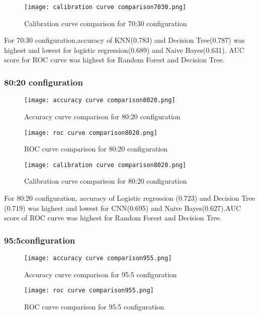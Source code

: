 \documentclass{article}
\begin{document}
\begin{figure}[H]
\centering
\texttt{[image: calibration curve comparison7030.png]}
\caption {Calibration curve comparison for 70:30 configuration}
\label{fig-name}
\end{figure}

For 70:30 configuration,accuracy of KNN(0.783) and Decision Tree(0.787) was highest and lowest for logistic regression(0.689) and Naive Bayes(0.631). AUC score for ROC curve was highest for Random Forest and Decision Tree.
\subsubsection{80:20 configuration}
\begin{figure}[H]
\centering
\texttt{[image: accuracy curve comparison8020.png]}
\caption {Accuracy curve comparison for 80:20 configuration}
\label{fig-name}
\end{figure}

\begin{figure}[H]
\centering
\texttt{[image: roc curve comparison8020.png]}
\caption {ROC curve comparison for 80:20 configuration}
\label{fig-name}
\end{figure}


\begin{figure}[H]
\centering
\texttt{[image: calibration curve comparison8020.png]}
\caption {Calibration curve comparison for 80:20 configuration}
\label{fig-name}
\end{figure}
For 80:20 configuration, accuracy of Logistic regression (0.723) and Decision Tree (0.719) was highest and lowest for CNN(0.695) and Naive Bayes(0.627).AUC score of ROC curve was highest for Random Forest and Decision Tree.

\subsubsection{95:5configuration}
\begin{figure}[H]
\centering
\texttt{[image: accuracy curve comparison955.png]}
\caption {Accuracy curve comparison for 95:5 configuration}
\label{fig-name}
\end{figure}


\begin{figure}[H]
\centering
\texttt{[image: roc curve comparison955.png]}
\caption {ROC curve comparison for 95:5 configuration}
\label{fig-name}
\end{figure}
\end{document}
